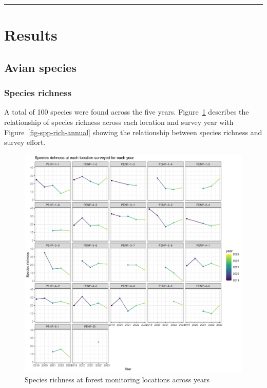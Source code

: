\documentclass[
  letterpaper,
  DIV=11,
  numbers=noendperiod,
  oneside]{scrartcl}
\begin{document}
\begin{center}\rule{0.5\linewidth}{0.5pt}\end{center}

\hypertarget{results}{%
\section{Results}\label{results}}

\hypertarget{avian-species}{%
\subsection{Avian species}\label{avian-species}}

\hypertarget{species-richness}{%
\subsubsection{Species richness}\label{species-richness}}

A total of 100 species were found across the five years.
Figure~\ref{fig-spp-rich-locs} describes the relationship of species
richness across each location and survey year with
Figure~\ref{fig-spp-rich-annual} showing the relationship between
species richness and survey effort.

\begin{figure}

{\centering \includegraphics{peinp_files/figure-pdf/fig-spp-rich-locs-1.pdf}

}

\caption{\label{fig-spp-rich-locs}Species richness at forest monitoring
locations across years}

\end{figure}
\end{document}
